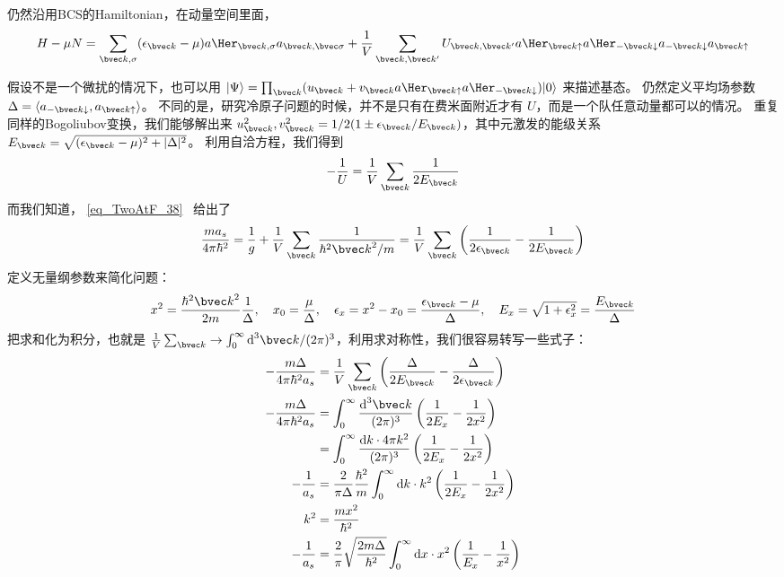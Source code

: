 
仍然沿用BCS的Hamiltonian，在动量空间里面，
\begin{equation}
H-\mu N = \sum_{{\bvec k},\sigma}(\epsilon_{\bvec k}-\mu)a\Her_{{\bvec k},\sigma}a_{\bvec k, \bvec \sigma}+\frac{1}{V}\sum_{\bvec k,  \bvec k'}U_{\bvec k, \bvec k'}a\Her_{\bvec k\uparrow}a\Her_{-\bvec k\downarrow}a_{-\bvec k\downarrow}a_{\bvec k\uparrow}
\end{equation}

假设不是一个微扰的情况下，也可以用 $|\Psi\rangle = \prod_{\bvec k}(u_{\bvec k}+v_{\bvec k}a\Her_{\bvec k\uparrow}a\Her_{-\bvec k\downarrow})|0\rangle$ 来描述基态。 仍然定义平均场参数 $\Delta = \langle a_{-\bvec k\downarrow},a_{\bvec k\uparrow}\rangle$。 不同的是，研究冷原子问题的时候，并不是只有在费米面附近才有 $U$，而是一个队任意动量都可以的情况。 重复同样的Bogoliubov变换，我们能够解出来 $u_{\bvec k}^2, v_{\bvec k}^2 = 1/2(1\pm\epsilon_{\bvec k}/E_{\bvec k})$，其中元激发的能级关系$E_{\bvec k}=\sqrt{(\epsilon_{\bvec k}-\mu)^2+|\Delta|^2}$。 利用自洽方程，我们得到
\begin{equation}
-\frac{1}{U} = \frac{1}{V}\sum_{\bvec k}\frac{1}{2E_{\bvec k}}
\end{equation}
而我们知道， \autoref{eq_TwoAtF_38}~ 给出了
\begin{equation}
\frac{ma_s}{4\pi\hbar^2} = \frac{1}{g} + \frac{1}{V}\sum_{\bvec k}\frac{1}{\hbar^2{\bvec k}^2/m} = \frac{1}{V}\sum_{\bvec k}\left(\frac{1}{2\epsilon_{\bvec k}} - \frac{1}{2E_{\bvec k}}\right)
\end{equation}
定义无量纲参数来简化问题：
\begin{equation}
x^2 = \frac{\hbar^2{\bvec k}^2}{2m}\frac{1}{\Delta},\quad x_0 = \frac{\mu}{\Delta},\quad \epsilon_x = x^2-x_0 = \frac{\epsilon_{\bvec k}-\mu}{\Delta},\quad E_x = \sqrt{1+\epsilon_x^2} = \frac{E_{\bvec k}}{\Delta}
\end{equation}
把求和化为积分，也就是 $\frac{1}{V}\sum_{\bvec k}\to\int_0^\infty \text{d}^3{\bvec k}/(2\pi)^3$，利用求对称性，我们很容易转写一些式子：
\begin{equation}
\begin{split}
-\frac{m\Delta}{4\pi\hbar^2 a_s} &=\frac{1}{V}\sum_{\bvec k}\left(\frac{\Delta}{2E_{\bvec k}} - \frac{\Delta}{2\epsilon_{\bvec k}}\right)\\
-\frac{m\Delta}{4\pi\hbar^2 a_s} &=\int_0^\infty\frac{\text{d}^3{\bvec k}}{(2\pi)^3}\left(\frac{1}{2E_x} - \frac{1}{2x^2}\right) \\
&=\int_0^\infty\frac{\text{d}k\cdot 4\pi k^2}{(2\pi)^3}\left(\frac{1}{2E_x} - \frac{1}{2x^2}\right)\\
-\frac{1}{a_s} &= \frac{2}{\pi\Delta}\frac{\hbar^2}{m}\int_0^\infty\text{d}k\cdot k^2\left(\frac{1}{2E_x} - \frac{1}{2x^2}\right)\\
k^2 &= \frac{mx^2}{\hbar^2}\\
-\frac{1}{a_s} &= \frac{2}{\pi}\sqrt{\frac{2m\Delta}{\hbar^2}}\int_0^\infty \text{d}x\cdot x^2\left(\frac{1}{E_x}-\frac{1}{x^2}\right)
\end{split}
\end{equation}
